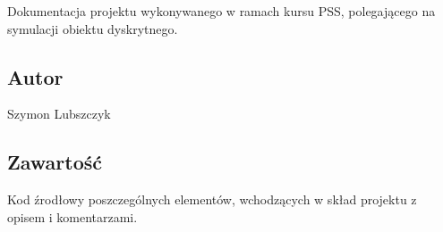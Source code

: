 Dokumentacja projektu wykonywanego w ramach kursu P\-S\-S, polegającego na symulacji obiektu dyskrytnego.

\subsection*{Autor}

Szymon Lubszczyk \subsection*{Zawartość}

Kod źrodłowy poszczególnych elementów, wchodzących w skład projektu z opisem i komentarzami. 